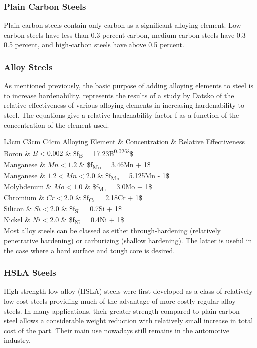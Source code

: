 \documentclass[a4paper,openany,nobib]{tufte-book}
\begin{document}
\subsubsection{Plain Carbon Steels}
\label{plain-carbon-steels}
Plain carbon steels contain only carbon as a significant alloying
element. Low-carbon steels have less than 0.3 percent carbon,
medium-carbon steels have 0.3 -- 0.5 percent, and high-carbon steels
have above 0.5 percent.

\subsubsection{Alloy Steels}
\label{alloy-steels}
As mentioned previously, the basic purpose of adding alloying elements
to steel is to increase hardenability. represents the results of a study
by Datsko \cite{datsko1977materials} of the relative effectiveness of
various alloying elements in increasing hardenability to steel. The
equations give a relative hardenability factor f as a function of the
concentration of the element used.


 L3cm C3cm C4cm Alloying Element \& Concentration \& Relative
Effectiveness\\
Boron \& \(B < 0.002\) \& \$f\textsubscript{B} = 17.23B\textsuperscript{0.0268}\$\\
Manganese \& \(Mn < 1.2\) \& \$f\textsubscript{Mn} = 3.46Mn + 1\$\\
Manganese \& \(1.2 < Mn < 2.0\) \& \$f\textsubscript{Mn} = 5.125Mn - 1\$\\
Molybdenum \& \(Mo < 1.0\) \& \$f\textsubscript{Mo} = 3.0Mo + 1\$\\
Chromium \& \(Cr < 2.0\) \& \$f\textsubscript{Cr} = 2.18Cr + 1\$\\
Silicon \& \(Si < 2.0\) \& \$f\textsubscript{Si} = 0.7Si + 1\$\\
Nickel \& \(Ni < 2.0\) \& \$f\textsubscript{Ni} = 0.4Ni + 1\$\\

Most alloy steels can be classed as either through-hardening (relatively
penetrative hardening) or carburizing (shallow hardening). The latter is
useful in the case where a hard surface and tough core is desired.

\subsubsection{HSLA Steels}
\label{hsla-steels}
High-strength low-alloy (HSLA) steels were first developed as a class of
relatively low-cost steels providing much of the advantage of more
costly regular alloy steels. In many applications, their greater
strength compared to plain carbon steel allows a considerable weight
reduction with relatively small increase in total cost of the part.
Their main use nowadays still remains in the automotive industry.
\end{document}
